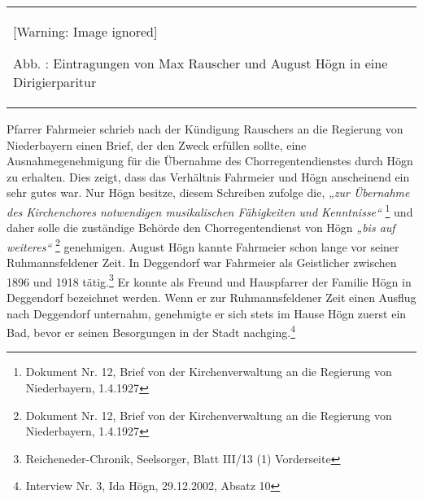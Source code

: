 \documentclass[a4paper]{article}
\newcommand\textstyleZitate[1]{\textit{#1}}
\newcommand\textstyleFunotenTextZchn[1]{#1}
\newcounter{Abb}
\renewcommand\theAbb{\arabic{Abb}}
\begin{document}
\begin{center}
\begin{minipage}{4.142cm}
\begin{flushleft}
\tablefirsthead{}
\tablehead{}
\tabletail{}
\tablelasttail{}
\begin{supertabular}{m{3.9420002cm}}
  [Warning: Image ignored] %
 
\label{bkm:Ref100166968}Abb. \stepcounter{Abb}{\theAbb}: Eintragungen
von Max Rauscher und August Högn in eine Dirigierparitur\\
\end{supertabular}
\end{flushleft}
\end{minipage}
\end{center}
Pfarrer Fahrmeier schrieb nach der Kündigung Rauschers an die Regierung
von Niederbayern einen Brief, der den Zweck erfüllen sollte, eine
Ausnahmegenehmigung für die Übernahme des Chorregentendienstes durch
Högn zu erhalten. Dies zeigt, dass das Verhältnis Fahrmeier und Högn
anscheinend ein sehr gutes war. Nur Högn besitze, diesem Schreiben
zufolge die, \textstyleZitate{„zur Übernahme des Kirchenchores
notwendigen musikalischen Fähigkeiten und Kenntnisse“ }\footnote{
Dokument Nr. 12, Brief von der Kirchenverwaltung an die Regierung von
Niederbayern, 1.4.1927} und daher solle die zuständige Behörde den
Chorregentendienst von Högn \textstyleZitate{„bis auf weiteres“
}\footnote{ Dokument Nr. 12, Brief von der Kirchenverwaltung an die
Regierung von Niederbayern, 1.4.1927} genehmigen. August Högn kannte
Fahrmeier schon lange vor seiner Ruhmannsfeldener Zeit. In Deggendorf
war Fahrmeier als Geistlicher zwischen 1896 und 1918 tätig.\footnote{
Reicheneder-Chronik, \textstyleFunotenTextZchn{Seelsorger, Blatt III/13
(1) Vorderseite}} Er konnte als Freund und Hauspfarrer der Familie Högn
in Deggendorf bezeichnet werden. Wenn er zur Ruhmannsfeldener Zeit
einen Ausflug nach Deggendorf unternahm, genehmigte er sich stets im
Hause Högn zuerst ein Bad, bevor er seinen Besorgungen in der Stadt
nachging.\footnote{ Interview Nr. 3, Ida Högn, 29.12.2002, Absatz 10}
\end{document}

